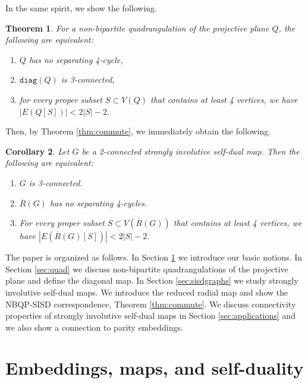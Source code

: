 \documentclass[10pt,a4paper]{article}
\newtheorem{theorem}{Theorem}[section]
\newtheorem{corollary}[theorem]{Corollary}
\newcommand{\diag}[0]{\mathtt{diag}}
\begin{document}
In the same spirit, we show the following.  

\begin{theorem}\label{thm:3connected}
     For a non-bipartite quadrangulation of the projective plane $Q$, the following are equivalent:
     \begin{enumerate}
         \item[a)] $Q$ has no separating 4-cycle,
         \item[b)] $\diag(Q)$ is 3-connected,
         \item[c)] for every proper subset $S\subset V(Q)$ that contains at least 4 vertices, we have $|E(Q[S])|< 2|S|-2$.
     \end{enumerate}
\end{theorem}

Then,  by Theorem \ref{thm:commute}, we immediately obtain the following.
 
\begin{corollary}\label{col:3conequiv}
    Let $G$ be a 2-connected strongly involutive self-dual map. Then the following are equivalent:
    \begin{enumerate}
        \item $G$ is 3-connected.
        \item $\overline R(G)$ has no separating 4-cycles.
        \item For every proper subset $S\subset V(\overline R(G))$ that contains at least 4 vertices, we have $|E(\overline R(G)[S])|< 2|S|-2$.
    \end{enumerate}
    
\end{corollary}






The paper is organized as follows. In Section \ref{sec:notions} we introduce our basic notions. In Section \ref{sec:quad} we discuss non-bipartite quadrangulations of the projective plane and define the diagonal map. In Section \ref{sec:sisdgraphs} we study strongly involutive self-dual maps. We introduce the reduced radial map and show the NBQP-SISD correspondence, Theorem \ref{thm:commute}. We discuss connectivity properties of strongly involutive self-dual maps in Section \ref{sec:applications} and we also show a connection to parity embeddings.  



\section{Embeddings, maps, and self-duality}\label{sec:notions}
\end{document}
